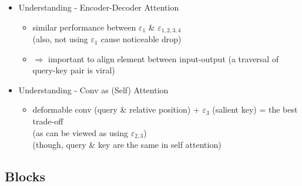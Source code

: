 \begin{itemize}
\begin{itemize}
	\item Understanding - Encoder-Decoder Attention
		\begin{itemize}
		\item similar performance between $\varepsilon_{1}$ \& $\varepsilon_{1,2,3,4}$ \\
		(also, not using $\varepsilon_1$ cause noticeable drop)
		\item $\Rightarrow$ important to align element between input-output (a traversal of query-key pair is viral)
		\end{itemize}
	\item Understanding - Conv as (Self) Attention
		\begin{itemize}
		\item deformable conv {\small(query \& relative position)} + $\varepsilon_{3}$ {\small(salient key)} = the best trade-off \\
		(as can be viewed as using $\varepsilon_{2,3}$) \\
		(though, query \& key are the same in self attention)
		\end{itemize}
	\end{itemize}
\end{itemize}

\subsection{Blocks}
